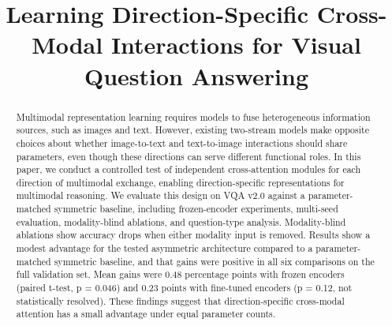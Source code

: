 \documentclass[conference]{IEEEtran}
\begin{document}
\title{Learning Direction-Specific Cross-Modal Interactions for Visual Question Answering}

\author{
\and
{}
}

\maketitle

\begin{abstract}
Multimodal representation learning requires models to fuse heterogeneous information sources, such as images and text. However, existing two-stream models make opposite choices about whether image-to-text and text-to-image interactions should share parameters, even though these directions can serve different functional roles. In this paper, we conduct a controlled test of independent cross-attention modules for each direction of multimodal exchange, enabling direction-specific representations for multimodal reasoning. We evaluate this design on VQA v2.0 against a parameter-matched symmetric baseline, including frozen-encoder experiments, multi-seed evaluation, modality-blind ablations, and question-type analysis. Modality-blind ablations show accuracy drops when either modality input is removed. Results show a modest advantage for the tested asymmetric architecture compared to a parameter-matched symmetric baseline, and that gains were positive in all six comparisons on the full validation set. Mean gains were 0.48 percentage points with frozen encoders (paired t-test, p = 0.046) and 0.23 points with fine-tuned encoders (p = 0.12, not statistically resolved). These findings suggest that direction-specific cross-modal attention has a small advantage under equal parameter counts.
\end{abstract}
\end{document}
